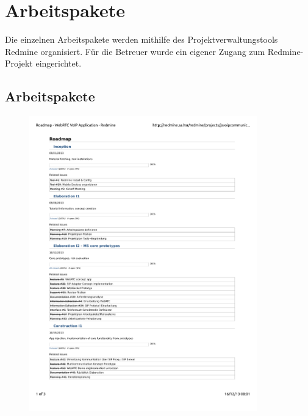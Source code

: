 \chapter{Arbeitspakete}
Die einzelnen Arbeitspakete werden mithilfe des Projektverwaltungstools Redmine
organisiert. Für die Betreuer wurde ein eigener Zugang zum Redmine-Projekt eingerichtet.


\section{Arbeitspakete}
	\begin{figure}[H]
		\includegraphics[trim=1.75cm 2cm 2cm 2.5cm, clip=true,page=1,width=0.88\textwidth]{../projektplan/media/roadmap.pdf}
	\end{figure}

